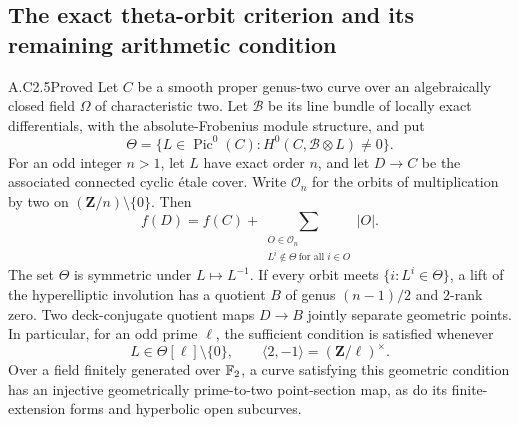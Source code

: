 \subsection{The exact theta-orbit criterion and its remaining arithmetic condition}

\begin{claim}{A.C2.5}{Proved}
Let $C$ be a smooth proper genus-two curve over an algebraically closed
field $\Omega$ of characteristic two. Let $\mathcal B$ be its line bundle
of locally exact differentials, with the absolute-Frobenius module
structure, and put
\[
 \Theta=\{L\in\operatorname{Pic}^0(C):
                   H^0(C,\mathcal B\otimes L)\ne0\}.
\]
For an odd integer $n>1$, let $L$ have exact order $n$, and let
$D\to C$ be the associated connected cyclic \'etale cover. Write
$\mathcal O_n$ for the orbits of multiplication by two on
$(\mathbf Z/n)\setminus\{0\}$. Then
\[
 f(D)=f(C)+
 \sum_{\substack{O\in\mathcal O_n\\
                  L^i\notin\Theta\ \text{for all }i\in O}}|O|.
                                                               \tag{C2.16}
\]
The set $\Theta$ is symmetric under $L\mapsto L^{-1}$.
If every orbit meets $\{i:L^i\in\Theta\}$, a lift of the
hyperelliptic involution has a quotient $B$ of genus $(n-1)/2$
and $2$-rank zero. Two deck-conjugate quotient maps $D\to B$
jointly separate geometric points. In particular, for an odd prime
$\ell$, the sufficient condition is satisfied whenever
\[
 L\in\Theta[\ell]\setminus\{0\},\qquad
               \langle2,-1\rangle=(\mathbf Z/\ell)^\times.       \tag{C2.17}
\]
Over a field finitely generated over $\mathbb F_2$, a curve satisfying
this geometric condition has an injective geometrically
prime-to-two point-section map, as do its finite-extension forms
and hyperbolic open subcurves.
\end{claim}
